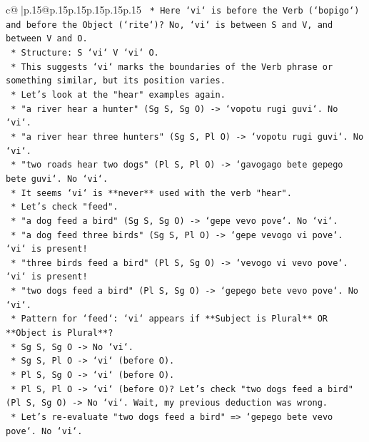 \documentclass{article}
\begin{document}
{\begin{supertabular}{c@{$\;$}|p{.15\linewidth}@{}p{.15\linewidth}p{.15\linewidth}p{.15\linewidth}p{.15\linewidth}p{.15\linewidth}}
{{{\texttt{            *   Here `vi` is before the Verb (`bopigo`) and before the Object (`rite`)? No, `vi` is between S and V, and between V and O.} \\
\texttt{            *   Structure: S `vi` V `vi` O.} \\
\texttt{        *   This suggests `vi` marks the boundaries of the Verb phrase or something similar, but its position varies.} \\
\texttt{        *   Let's look at the "hear" examples again.} \\
\texttt{            *   "a river hear a hunter" (Sg S, Sg O) {-}> `vopotu rugi guvi`. No `vi`.} \\
\texttt{            *   "a river hear three hunters" (Sg S, Pl O) {-}> `vopotu rugi guvi`. No `vi`.} \\
\texttt{            *   "two roads hear two dogs" (Pl S, Pl O) {-}> `gavogago bete gepego bete guvi`. No `vi`.} \\
\texttt{            *   It seems `vi` is **never** used with the verb "hear".} \\
\texttt{        *   Let's check "feed".} \\
\texttt{            *   "a dog feed a bird" (Sg S, Sg O) {-}> `gepe vevo pove`. No `vi`.} \\
\texttt{            *   "a dog feed three birds" (Sg S, Pl O) {-}> `gepe vevogo vi pove`. `vi` is present!} \\
\texttt{            *   "three birds feed a bird" (Pl S, Sg O) {-}> `vevogo vi vevo pove`. `vi` is present!} \\
\texttt{            *   "two dogs feed a bird" (Pl S, Sg O) {-}> `gepego bete vevo pove`. No `vi`.} \\
\texttt{            *   Pattern for `feed`: `vi` appears if **Subject is Plural** OR **Object is Plural**?} \\
\texttt{                *   Sg S, Sg O {-}> No `vi`.} \\
\texttt{                *   Sg S, Pl O {-}> `vi` (before O).} \\
\texttt{                *   Pl S, Sg O {-}> `vi` (before O).} \\
\texttt{                *   Pl S, Pl O {-}> `vi` (before O)? Let's check "two dogs feed a bird" (Pl S, Sg O) {-}> No `vi`. Wait, my previous deduction was wrong.} \\
\texttt{                *   Let's re{-}evaluate "two dogs feed a bird" => `gepego bete vevo pove`. No `vi`.} \\
}}}
\end{supertabular}}
\end{document}
